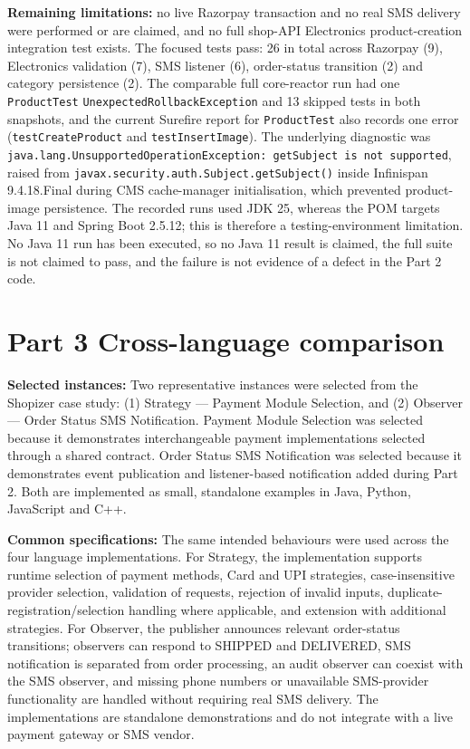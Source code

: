 \documentclass[11pt,a4paper]{article}
\begin{document}
\textbf{Remaining limitations:} no live Razorpay transaction and no real SMS delivery were performed or are claimed, and no full shop-API Electronics product-creation integration test exists. The focused tests pass: 26 in total across Razorpay (9), Electronics validation (7), SMS listener (6), order-status transition (2) and category persistence (2). The comparable full core-reactor run had one \texttt{Product\allowbreak{}Test} \texttt{Unexpected\allowbreak{}Rollback\allowbreak{}Exception} and 13 skipped tests in both snapshots, and the current Surefire report for \texttt{Product\allowbreak{}Test} also records one error (\texttt{test\allowbreak{}Create\allowbreak{}Product} and \texttt{test\allowbreak{}Insert\allowbreak{}Image}). The underlying diagnostic was \texttt{java.\allowbreak{}lang.\allowbreak{}UnsupportedOperationException: getSubject is not supported}, raised from \texttt{javax.\allowbreak{}security.\allowbreak{}auth.\allowbreak{}Subject.\allowbreak{}getSubject()} inside Infinispan 9.4.18.Final during CMS cache-manager initialisation, which prevented product-image persistence. The recorded runs used JDK 25, whereas the POM targets Java 11 and Spring Boot 2.5.12; this is therefore a testing-environment limitation. No Java 11 run has been executed, so no Java 11 result is claimed, the full suite is not claimed to pass, and the failure is not evidence of a defect in the Part 2 code.

\section{Part 3 Cross-language comparison}

\textbf{Selected instances:} Two representative instances were selected from the Shopizer case study: (1) Strategy --- Payment Module Selection, and (2) Observer --- Order Status SMS Notification. Payment Module Selection was selected because it demonstrates interchangeable payment implementations selected through a shared contract. Order Status SMS Notification was selected because it demonstrates event publication and listener-based notification added during Part 2. Both are implemented as small, standalone examples in Java, Python, JavaScript and C++.

\textbf{Common specifications:} The same intended behaviours were used across the four language implementations. For Strategy, the implementation supports runtime selection of payment methods, Card and UPI strategies, case-insensitive provider selection, validation of requests, rejection of invalid inputs, duplicate-registration/selection handling where applicable, and extension with additional strategies. For Observer, the publisher announces relevant order-status transitions; observers can respond to SHIPPED and DELIVERED, SMS notification is separated from order processing, an audit observer can coexist with the SMS observer, and missing phone numbers or unavailable SMS-provider functionality are handled without requiring real SMS delivery. The implementations are standalone demonstrations and do not integrate with a live payment gateway or SMS vendor.
\end{document}
